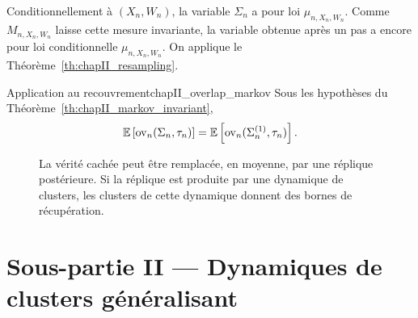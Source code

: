\begin{Preuve}
Conditionnellement à $(X_n,W_n)$, la variable $\Sigma_n$ a pour loi $\mu_{n,X_n,W_n}$. Comme $M_{n,X_n,W_n}$ laisse cette mesure invariante, la variable obtenue après un pas a encore pour loi conditionnelle $\mu_{n,X_n,W_n}$. On applique le Théorème~\ref{th:chapII_resampling}.
\end{Preuve}

\begin{Corollaire}{Application au recouvrement}{chapII_overlap_markov}
Sous les hypothèses du Théorème~\ref{th:chapII_markov_invariant},
\begin{equation}
    \mathbb E\left[\operatorname{ov}_n(\Sigma_n,\tau_n)\right]
    =
    \mathbb E\left[\operatorname{ov}_n(\Sigma_n^{(1)},\tau_n)\right].
    \label{eq:chapII_overlap_markov}
\end{equation}
\end{Corollaire}

\begin{figure}[H]
\centering
{}
\caption{La vérité cachée peut être remplacée, en moyenne, par une réplique postérieure. Si la réplique est produite par une dynamique de clusters, les clusters de cette dynamique donnent des bornes de récupération.}
\label{fig:chapII_resampling}
\end{figure}

\section*{Sous-partie II --- Dynamiques de clusters généralisant }
\label{sec:chapII_partie_dynamique}

